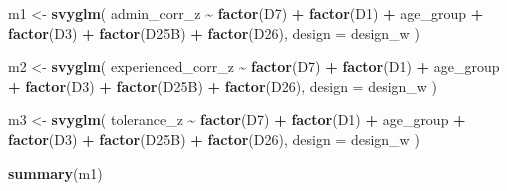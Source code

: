 \documentclass[
]{article}
\newenvironment{Shaded}{\begin{snugshade}}{\end{snugshade}}
\newcommand{\AttributeTok}[1]{\textcolor[rgb]{0.13,0.29,0.53}{#1}}
\newcommand{\FunctionTok}[1]{\textcolor[rgb]{0.13,0.29,0.53}{\textbf{#1}}}
\newcommand{\NormalTok}[1]{#1}
\newcommand{\OtherTok}[1]{\textcolor[rgb]{0.56,0.35,0.01}{#1}}
\newcommand{\SpecialCharTok}[1]{\textcolor[rgb]{0.81,0.36,0.00}{\textbf{#1}}}
\begin{document}
\begin{Shaded}
\begin{Highlighting}[]
\NormalTok{m1 }\OtherTok{\textless{}{-}} \FunctionTok{svyglm}\NormalTok{(}
\NormalTok{  admin\_corr\_z }\SpecialCharTok{\textasciitilde{}} \FunctionTok{factor}\NormalTok{(D7) }\SpecialCharTok{+} \FunctionTok{factor}\NormalTok{(D1) }\SpecialCharTok{+}\NormalTok{ age\_group }\SpecialCharTok{+}
    \FunctionTok{factor}\NormalTok{(D3) }\SpecialCharTok{+} \FunctionTok{factor}\NormalTok{(D25B) }\SpecialCharTok{+} \FunctionTok{factor}\NormalTok{(D26),}
  \AttributeTok{design =}\NormalTok{ design\_w}
\NormalTok{)}

\NormalTok{m2 }\OtherTok{\textless{}{-}} \FunctionTok{svyglm}\NormalTok{(}
\NormalTok{  experienced\_corr\_z }\SpecialCharTok{\textasciitilde{}} \FunctionTok{factor}\NormalTok{(D7) }\SpecialCharTok{+} \FunctionTok{factor}\NormalTok{(D1) }\SpecialCharTok{+}\NormalTok{ age\_group }\SpecialCharTok{+}
    \FunctionTok{factor}\NormalTok{(D3) }\SpecialCharTok{+} \FunctionTok{factor}\NormalTok{(D25B) }\SpecialCharTok{+} \FunctionTok{factor}\NormalTok{(D26),}
  \AttributeTok{design =}\NormalTok{ design\_w}
\NormalTok{)}

\NormalTok{m3 }\OtherTok{\textless{}{-}} \FunctionTok{svyglm}\NormalTok{(}
\NormalTok{  tolerance\_z }\SpecialCharTok{\textasciitilde{}} \FunctionTok{factor}\NormalTok{(D7) }\SpecialCharTok{+} \FunctionTok{factor}\NormalTok{(D1) }\SpecialCharTok{+}\NormalTok{ age\_group }\SpecialCharTok{+}
    \FunctionTok{factor}\NormalTok{(D3) }\SpecialCharTok{+} \FunctionTok{factor}\NormalTok{(D25B) }\SpecialCharTok{+} \FunctionTok{factor}\NormalTok{(D26),}
  \AttributeTok{design =}\NormalTok{ design\_w}
\NormalTok{)}

\FunctionTok{summary}\NormalTok{(m1)}
\end{Highlighting}
\end{Shaded}
\end{document}
